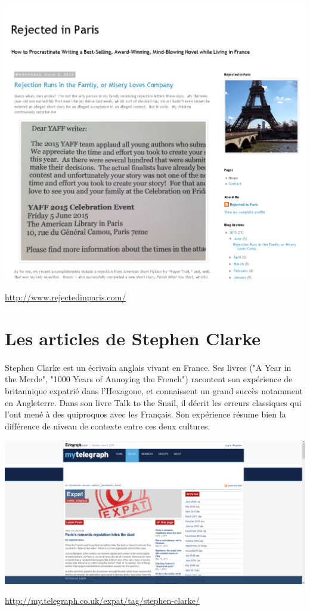 \begin{center}
	\includegraphics[scale=0.25]{Rejected.png}
\end{center}
\url{http://www.rejectedinparis.com/}

\section{Les articles de Stephen Clarke}
\paragraph{}
Stephen Clarke est un écrivain anglais vivant en France. Ses livres ("A Year in the Merde", "1000 Years of Annoying the French") racontent son expérience de britannique expatrié dans l'Hexagone, et connaissent un grand succès notamment en Angleterre. Dans son livre Talk to the Snail, il décrit les erreurs classiques qui l'ont mené à des quiproquos avec les Français. Son expérience résume bien la différence de niveau de contexte entre ces deux cultures.

\begin{center}
	\includegraphics[scale=0.25]{stephenClarke.png}
\end{center}
\url{http://my.telegraph.co.uk/expat/tag/stephen-clarke/}

